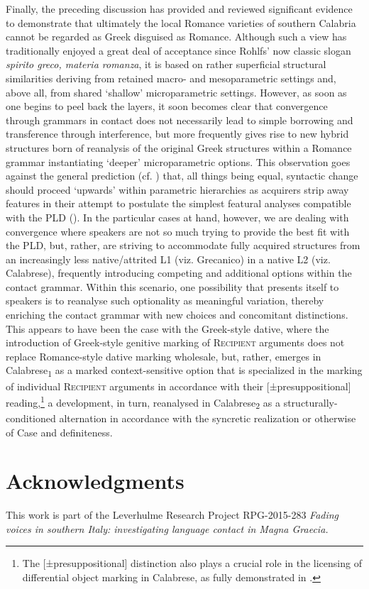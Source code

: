 \documentclass[output=paper,modfonts,nonflat,colorlinks,citecolor=brown]{langsci/langscibook}
\begin{document}
Finally, the preceding discussion has provided and reviewed significant evidence to demonstrate that ultimately the local Romance varieties of southern Calabria cannot be regarded as Greek disguised as Romance. Although such a view has traditionally enjoyed a great deal of acceptance since Rohlfs’ now classic slogan \textit{spirito greco, materia romanza}, it is based on rather superficial structural similarities deriving from retained macro- and mesoparametric settings and, above all, from shared `shallow' microparametric settings. However, as soon as one begins to peel back the layers, it soon becomes clear that convergence through grammars in contact does not necessarily lead to simple borrowing and transference through interference, but more frequently gives rise to new hybrid structures born of reanalysis of the original Greek structures within a Romance grammar instantiating `deeper' microparametric options. This observation goes against the general prediction (cf. \citealt{BiberauerRoberts2012hierarchy}) that, all things being equal, syntactic change should proceed `upwards' within parametric hierarchies as acquirers strip away features in their attempt to postulate the simplest featural analyses compatible with the PLD (\citealt{RobertsRoussou2003}). In the particular cases at hand, however, we are dealing with convergence where speakers are not so much trying to provide the best fit with the PLD, but, rather, are striving to accommodate fully acquired structures from an increasingly less native/attrited L1 (viz. Grecanico) in a native L2 (viz. Calabrese), frequently introducing competing and additional options within the contact grammar. Within this scenario, one possibility that presents itself to speakers is to reanalyse such optionality as meaningful variation, thereby enriching the contact grammar with new choices and concomitant distinctions. This appears to have been the case with the Greek-style dative, where the introduction of Greek-style genitive marking of R\textsc{ecipient} arguments does not replace Romance-style dative marking wholesale, but, rather, emerges in Calabrese\textsubscript{1} as a marked context-sensitive option that is specialized in the marking of individual \textsc{Recipient} arguments in accordance with their [±presuppositional] reading,\footnote{The [±presuppositional] distinction also plays a crucial role in the licensing of differential object marking in Calabrese, as fully demonstrated in \citet{LedgewaySchifanoSilvestriInpress}.} a development, in turn, reanalysed in Calabrese\textsubscript{2} as a structurally-conditioned alternation in accordance with the syncretic realization or otherwise of Case and definiteness.

\section*{Acknowledgments}
This work is part of the Leverhulme Research Project RPG-2015-283 \textit{Fading voices in southern Italy: investigating language contact in Magna Graecia.}

\sloppy
\printbibliography[heading=subbibliography,notkeyword=this] 
\end{document}
